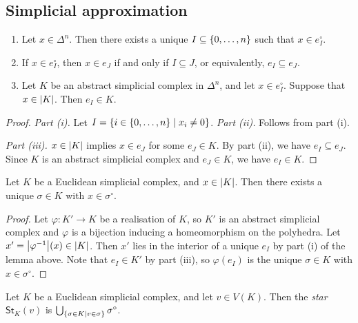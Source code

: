 \subsection{Simplicial approximation}
\begin{lemma}
	\begin{enumerate}
		\item Let \( x \in \Delta^n \).
			Then there exists a unique \( I \subseteq \qty{0, \dots, n} \) such that \( x \in e_I^\circ \).
		\item If \( x \in e_I^\circ \), then \( x \in e_J \) if and only if \( I \subseteq J \), or equivalently, \( e_I \subseteq e_J \).
		\item Let \( K \) be an abstract simplicial complex in \( \Delta^n \), and let \( x \in e_I^\circ \).
			Suppose that \( x \in \abs{K} \).
			Then \( e_I \in K \).
	\end{enumerate}
\end{lemma}
\begin{proof}
	\emph{Part (i).}
	Let \( I = \qty{i \in \qty{0, \dots, n} \mid x_i \neq 0} \).
	\emph{Part (ii).}
	Follows from part (i).

	\emph{Part (iii).}
	\( x \in \abs{K} \) implies \( x \in e_J \) for some \( e_J \in K \).
	By part (ii), we have \( e_I \subseteq e_J \).
	Since \( K \) is an abstract simplicial complex and \( e_J \in K \), we have \( e_I \in K \).
\end{proof}
\begin{corollary}
	Let \( K \) be a Euclidean simplicial complex, and \( x \in \abs{K} \).
	Then there exists a unique \( \sigma \in K \) with \( x \in \sigma^\circ \).
\end{corollary}
\begin{proof}
	Let \( \varphi \colon K' \to K \) be a realisation of \( K \), so \( K' \) is an abstract simplicial complex and \( \varphi \) is a bijection inducing a homeomorphism on the polyhedra.
	Let \( x' = \abs{\varphi^{-1}}(x) \in \abs{K} \).
	Then \( x' \) lies in the interior of a unique \( e_I \) by part (i) of the lemma above.
	Note that \( e_I \in K' \) by part (iii), so \( \varphi(e_I) \) is the unique \( \sigma \in K \) with \( x \in \sigma^\circ \).
\end{proof}
\begin{definition}
	Let \( K \) be a Euclidean simplicial complex, and let \( v \in V(K) \).
	Then the \emph{star} \( \mathsf{St}_K(v) \) is \( \bigcup_{\qty{\sigma \in K \mid v \in \sigma}} \sigma^\circ \).
\end{definition}
